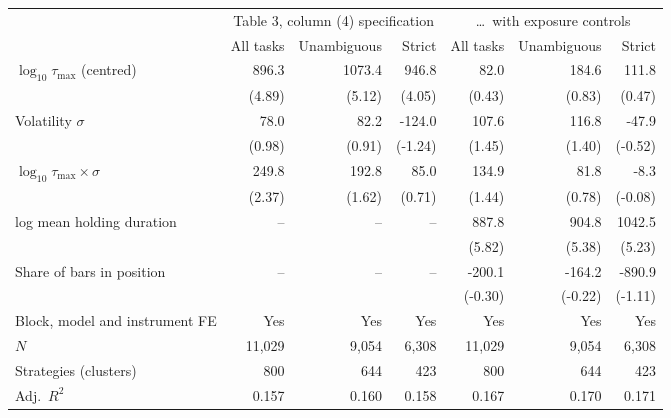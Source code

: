 \begin{tabular}{lrrrrrr}
\toprule
 & \multicolumn{3}{c}{Table 3, column (4) specification} & \multicolumn{3}{c}{\ldots\ with exposure controls} \\
\cmidrule(lr){2-4}\cmidrule(lr){5-7}
 & All tasks & Unambiguous & Strict & All tasks & Unambiguous & Strict \\
\midrule
$\log_{10}\tau_{\max}$ (centred) & 896.3 & 1073.4 & 946.8 & 82.0 & 184.6 & 111.8 \\
 & (4.89) & (5.12) & (4.05) & (0.43) & (0.83) & (0.47) \\
Volatility $\sigma$ & 78.0 & 82.2 & -124.0 & 107.6 & 116.8 & -47.9 \\
 & (0.98) & (0.91) & (-1.24) & (1.45) & (1.40) & (-0.52) \\
$\log_{10}\tau_{\max}\times\sigma$ & 249.8 & 192.8 & 85.0 & 134.9 & 81.8 & -8.3 \\
 & (2.37) & (1.62) & (0.71) & (1.44) & (0.78) & (-0.08) \\
log mean holding duration & -- & -- & -- & 887.8 & 904.8 & 1042.5 \\
 &  &  &  & (5.82) & (5.38) & (5.23) \\
Share of bars in position & -- & -- & -- & -200.1 & -164.2 & -890.9 \\
 &  &  &  & (-0.30) & (-0.22) & (-1.11) \\
\midrule
Block, model and instrument FE & Yes & Yes & Yes & Yes & Yes & Yes \\
$N$ & 11{,}029 & 9{,}054 & 6{,}308 & 11{,}029 & 9{,}054 & 6{,}308 \\
Strategies (clusters) & 800 & 644 & 423 & 800 & 644 & 423 \\
Adj.\ $R^2$ & 0.157 & 0.160 & 0.158 & 0.167 & 0.170 & 0.171 \\
\bottomrule
\end{tabular}

